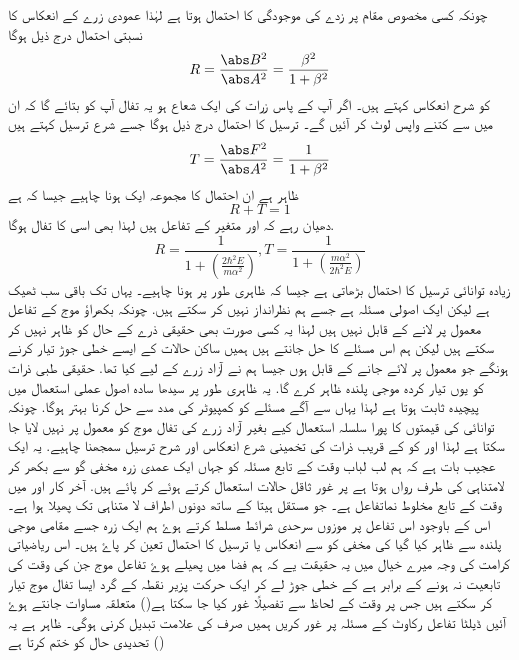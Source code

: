 چونکہ کسی مخصوص مقام پر زدے کی موجودگی کا احتمال  ہوتا ہے لہٰذا عمودی زرے کے انعکاس  کا نسبتی احتمال درج ذیل ہوگا\[R=\frac{\abs B^{2}}{\abs A^{2}}=\frac{\beta^{2}}{1+\beta^{2}}\]
کو شرح انعکاس کہتے ہیں۔ اگر آپ کے پاس زرات کی ایک شعاع ہو یہ تفال آپ کو بتائے گا کہ ان میں سے کتنے واپس لوٹ کر آئیں گے۔ ترسیل کا  احتمال درج ذیل ہوگا جسے شرع ترسیل کہتے ہیں\[T=\frac{\abs F^{2}}{\abs A^{2}}=\frac{1}{1+\beta^{2}}\]
 ظاہر ہے ان احتمال کا مجموعہ ایک  ہونا چاہیے جیسا کہ ہے \[R+T=1\]
 دھیان رہے کہ  اور   متغیر  کے تفاعل  ہیں لہذا  بھی اسی کا تفال ہوگا.
  \[R=\frac{1}{1+(\frac{2\hbar^{2}E}{m\alpha^{2}})}, T =\frac{1}{1+(\frac{m\alpha^{2}}{2\hbar^{2}E})}\]  زیادہ  توانائی ترسیل کا احتمال بڑھاتی ہے جیسا کہ ظاہری طور پر ہونا چاہیے۔  یہاں تک باقی سب ٹھیک ہے لیکن ایک اصولی مسئلہ ہے جسے ہم نظرانداز نہیں کر سکتے ہیں.  چونکہ بکھراؤ  موج کے  تفاعل معمول پر لانے کے قابل نہیں ہیں لہذا یہ کسی صورت بھی حقیقی  ذرے کے حال کو ظاہر نہیں کر سکتے ہیں لیکن ہم اس مسئلے کا حل جانتے ہیں ہمیں ساکن حالات کے ایسے خطی جوڑ تیار کرنے ہونگے جو معمول پر لائے جانے کے قابل ہوں جیسا ہم نے آزاد زرے  کے لیے کیا تھا.  حقیقی طبی ذرات کو یوں تیار کردہ موجی پلندہ ظاہر کرے گا.  یہ ظاہری طور پر سیدھا سادہ اصول عملی استعمال میں پیچیدہ ثابت ہوتا ہے لہذا یہاں سے آگے مسئلے کو کمپیوٹر کی مدد سے حل کرنا بہتر ہوگا.  چونکہ  توانائی کی قیمتوں کا پورا سلسلہ استعمال کیے بغیر آزاد زرے کی تفال موج کو معمول پر نہیں لایا جا سکتا ہے لہذا   اور  
  کو  کے قریب ذرات کی تخمینی شرع انعکاس   اور شرح ترسیل سمجھنا چاہیے.  یہ ایک عجیب بات ہے کہ ہم لب لباب وقت کے تابع مسئلہ کو جہاں ایک عمدی زرہ مخفی گو سے  بکھر کر لامتناہی کی طرف رواں ہوتا ہے پر غور ثاقل  حالات استعمال کرتے ہوئے کر پائے ہیں. آخر کار  اور  میں  وقت کے تابع مخلوط   نماتفاعل ہے۔ جو مستقل ہیتا کے ساتھ دونوں اطراف لا متناہی تک  پھیلا ہوا ہے۔ اس کے باوجود اس تفاعل پر موزوں سرحدی شرائط مسلط کرتے ہوۓ ہم  ایک زرہ جسے مقامی موجی پلندہ سے ظاہر کیا گیا کی مخفی کو سے انعکاس یا ترسیل کا احتمال تعین کر پاۓ ہیں۔ اس ریاضیاتی کرامت کی وجہ میرے خیال میں یہ حقیقت یے کہ  ہم فضا میں پھیلے ہوۓ تفاعل موج جن کی وقت کی تابعیت نہ ہونے کے برابر ہے کے خطی جوڑ لے کر ایک حرکت پزیر نقطہ کے گرد ایسا تفال موج تیار کر سکتے ہیں جس پر  وقت کے لحاظ سے تفصیلًا غور کیا جا سکتا ہے()
متعلقہ مساوات جانتے ہوۓ آئیں ڈیلٹا تفاعل  رکاوٹ کے مسئلہ پر غور کریں 
ہمیں صرف   کی علامت تبدیل کرنی ہوگی۔ ظاہر ہے یہ تحدیدی حال کو ختم کرتا ہے ()
